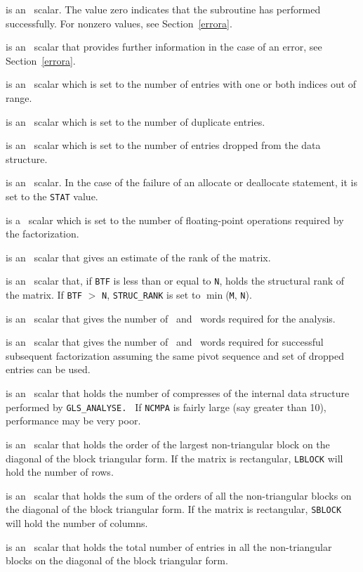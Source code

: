 \documentclass{galahad}
\newcommand{\packagename}{GLS}
\begin{document}
\begin{description}

 is an \integer\ scalar. The value
 zero indicates that the subroutine has performed
 successfully.  For nonzero values, see Section~\ref{errora}.

 is an \integer\ scalar that provides further information in the
case of an error, see Section~\ref{errora}.

 is an \integer\ scalar which is set to the number of
entries with one or both indices out of range. 

 is an \integer\ scalar which is set to the number of
duplicate entries.

 is an \integer\ scalar which is set to the number of
entries dropped from the data structure.

 is an \integer\ scalar. In the case of the failure of an
allocate or deallocate statement, it is set to the {\tt STAT} value.

 is a \realdp\  scalar which is set to the number of
 floating-point operations required by the factorization.

 is an \integer\ scalar that gives an estimate of the rank of the
matrix.

 is an \integer\ scalar that, if {\tt BTF} is less 
than or equal to {\tt N}, holds the
structural rank of the matrix. If {\tt BTF} $>$ {\tt N}, 
{\tt STRUC\_RANK} is set to $\min$({\tt M}, {\tt N}).

 is an \integer\ scalar that gives the number
 of \realdp\  and \integer\ words required for the analysis.

 is an \integer\ scalar that gives the number
 of \realdp\  and \integer\ words required for successful
 subsequent factorization assuming the same pivot sequence and set of
 dropped entries can be used.

 is an \integer\ scalar that holds the number of compresses
 of the internal data structure performed by {\tt \packagename\_ANALYSE.
} If {\tt NCMPA} is fairly large (say greater than 10), performance may be
 very poor.  

 is an \integer\ scalar that holds the order of the largest
non-triangular block on the diagonal of the block triangular form.
If the matrix is rectangular, {\tt LBLOCK} will hold the number of rows.

 is an \integer\ scalar that holds the sum of the orders of all the
non-triangular blocks on the diagonal of the block triangular form.
If the matrix is rectangular, {\tt SBLOCK} will hold the number of columns.

 is an \integer\ scalar that holds the total number of entries in all
the non-triangular blocks on the diagonal of the block triangular form.

\end{description}
\end{document}
